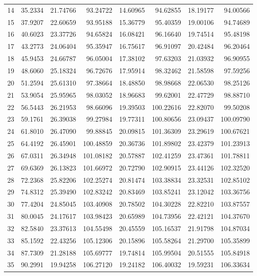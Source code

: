 \begin{table}[ht!]
{\begin{tabular}{@{}rrrrrrrr@{}}
14 & 35.2334 & 21.74766 & 93.24722  & 14.60965 & 94.62855  & 18.19177 & 94.00566  \\
15 & 37.9207 & 22.60659 & 93.95188  & 15.36779 & 95.40359  & 19.00106 & 94.74689  \\
16 & 40.6023 & 23.37726 & 94.65824  & 16.08421 & 96.16640  & 19.74514 & 95.48198  \\
17 & 43.2773 & 24.06404 & 95.35947  & 16.75617 & 96.91097  & 20.42484 & 96.20464  \\
18 & 45.9453 & 24.66787 & 96.05004  & 17.38102 & 97.63203  & 21.03932 & 96.90955  \\
19 & 48.6060 & 25.18324 & 96.72676  & 17.95914 & 98.32462  & 21.58598 & 97.59256  \\
20 & 51.2594 & 25.61310 & 97.38664  & 18.48850 & 98.98668  & 22.06530 & 98.25126  \\
21 & 53.9054 & 25.95965 & 98.03052  & 18.96683 & 99.62001  & 22.47729 & 98.88710  \\
22 & 56.5443 & 26.21953 & 98.66096  & 19.39503 & 100.22616 & 22.82070 & 99.50208  \\
23 & 59.1761 & 26.39038 & 99.27984  & 19.77311 & 100.80656 & 23.09437 & 100.09790 \\
24 & 61.8010 & 26.47090 & 99.88845  & 20.09815 & 101.36309 & 23.29619 & 100.67621 \\
25 & 64.4192 & 26.45901 & 100.48859 & 20.36736 & 101.89802 & 23.42379 & 101.23913 \\
26 & 67.0311 & 26.34948 & 101.08182 & 20.57887 & 102.41259 & 23.47361 & 101.78811 \\
27 & 69.6369 & 26.13823 & 101.66972 & 20.72790 & 102.90915 & 23.44126 & 102.32520 \\
28 & 72.2368 & 25.82206 & 102.25274 & 20.81474 & 103.38834 & 23.32531 & 102.85102 \\
29 & 74.8312 & 25.39490 & 102.83242 & 20.83469 & 103.85241 & 23.12042 & 103.36756 \\
30 & 77.4204 & 24.85045 & 103.40908 & 20.78502 & 104.30228 & 22.82210 & 103.87557 \\
31 & 80.0045 & 24.17617 & 103.98423 & 20.65989 & 104.73956 & 22.42121 & 104.37670 \\
32 & 82.5840 & 23.37613 & 104.55498 & 20.45559 & 105.16537 & 21.91798 & 104.87034 \\
33 & 85.1592 & 22.43256 & 105.12306 & 20.15896 & 105.58264 & 21.29700 & 105.35899 \\
34 & 87.7309 & 21.28188 & 105.69777 & 19.74814 & 105.99504 & 20.51555 & 105.84918 \\
35 & 90.2991 & 19.94258 & 106.27120 & 19.24182 & 106.40032 & 19.59231 & 106.33634 \\ \bottomrule
\end{tabular}%
}
\end{table}
\vfill
\clearpage

